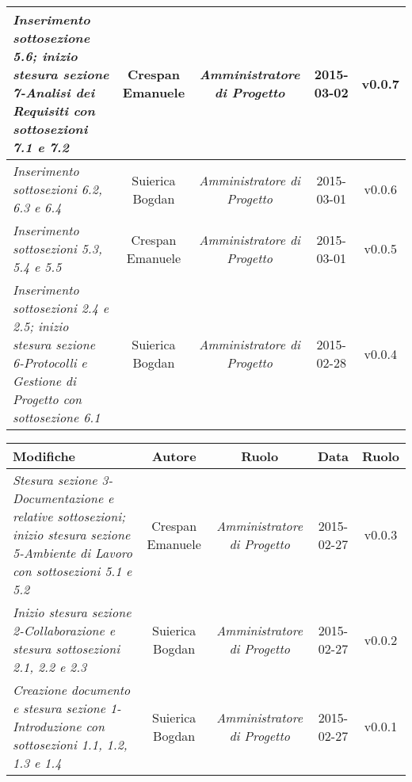\begin{table}[h]
\begin{tabular}{|p{}|c|c|c|c|}
	\midrule
		\textit{Inserimento sottosezione 5.6; inizio stesura sezione 7-Analisi dei Requisiti con sottosezioni 7.1 e 7.2} & Crespan Emanuele & \textit{Amministratore di Progetto} & 2015-03-02 & v0.0.7 \\
	\midrule
		\textit{Inserimento sottosezioni 6.2, 6.3 e 6.4} & Suierica Bogdan & \textit{Amministratore di Progetto} & 2015-03-01 & v0.0.6 \\
	\midrule
		\textit{Inserimento sottosezioni 5.3, 5.4 e 5.5} & Crespan Emanuele & \textit{Amministratore di Progetto} & 2015-03-01 & v0.0.5 \\
	\midrule
		\textit{Inserimento sottosezioni 2.4 e 2.5; inizio stesura sezione 6-Protocolli e Gestione di Progetto con sottosezione 6.1} & Suierica Bogdan & \textit{Amministratore di Progetto} & 2015-02-28 & v0.0.4 \\
	\bottomrule
\end{tabular}	
\end{table}
\newpage
\begin{table}[h]
\centering
\begin{tabular}{|p{}|c|c|c|c|}
	\toprule
		\textbf{Modifiche} & \textbf{Autore} & \textbf{Ruolo} & \textbf{Data} & \textbf{Ruolo} \\
	\midrule
	\midrule
		\textit{Stesura sezione 3-Documentazione e relative sottosezioni; inizio stesura sezione 5-Ambiente di Lavoro con sottosezioni 5.1 e 5.2} & Crespan Emanuele & \textit{Amministratore di Progetto} & 2015-02-27 & v0.0.3 \\ 
	\midrule
		\textit{Inizio stesura sezione 2-Collaborazione e stesura sottosezioni 2.1, 2.2 e 2.3} & Suierica Bogdan & \textit{Amministratore di Progetto} & 2015-02-27 & v0.0.2 \\	                         
	\midrule
		\textit{Creazione documento e stesura sezione 1-Introduzione con sottosezioni 1.1, 1.2, 1.3 e 1.4} & Suierica Bogdan & \textit{Amministratore di Progetto} & 2015-02-27 & v0.0.1 \\
	\bottomrule
\end{tabular}	
\end{table}
\newpage